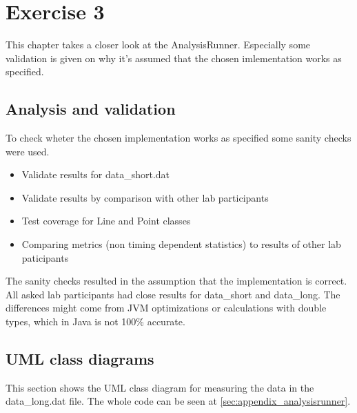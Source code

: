 \chapter{Exercise 3}
\label{chap:3}
This chapter takes a closer look at the AnalysisRunner. Especially some validation is given on why it's assumed that the chosen imlementation works as specified.

\section{Analysis and validation}
To check wheter the chosen implementation works as specified some sanity checks were used.
\begin{itemize}
    \item Validate results for data\_short.dat
    \item Validate results by comparison with other lab participants
    \item Test coverage for Line and Point classes
    \item Comparing metrics (non timing dependent statistics) to results of other lab paticipants
\end{itemize}

The sanity checks resulted in the assumption that the implementation is correct. All asked lab participants had close results for data\_short and data\_long. The differences might come from JVM optimizations or calculations with double types, which in Java is not 100\% accurate. 

\section{UML class diagrams}
\label{sec:class_diagram}
This section shows the UML class diagram for measuring the data in the data\_long.dat file. The whole code can be seen at \ref{sec:appendix_analysisrunner}.

